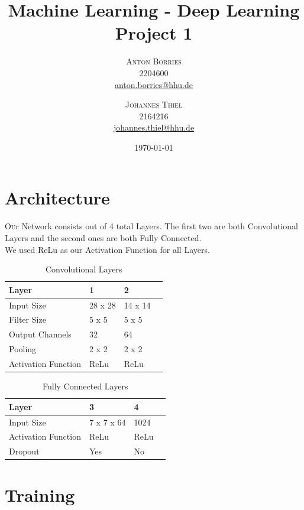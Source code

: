 \documentclass[twoside, twocolumn]{article}
\title{Machine Learning - Deep Learning Project 1} %
\author{%
\textsc{Anton Borries} \\[1ex] 
\normalsize 2204600 \\
\normalsize  \href{mailto:anton.borries@hhu.de}{anton.borries@hhu.de}
\and 
\textsc{Johannes Thiel} \\[1ex]
\normalsize 2164216 \\ 
\normalsize \href{mailto:johannes.thiel@hhu.de}{johannes.thiel@hhu.de} 
}
\date{\today} %
\begin{document}
\maketitle


\section{Architecture}

\lettrine[nindent=.2em,lines=3]{O} ur Network consists out of 4 total Layers. The first two are both Convolutional Layers and the second ones are both Fully Connected. \\
We used ReLu as our Activation Function for all Layers.

\begin{table}[htb]
\label{table_conv}
	\caption{Convolutional Layers}
	\centering
		\begin{tabular}{l l l l}
			Layer & 1 & 2 \\
			\midrule
			Input Size & 28 x 28 & 14 x 14 \\
			Filter Size & 5 x 5 & 5 x 5 \\
			Output Channels & 32 & 64 \\
			Pooling & 2 x 2 & 2 x 2 \\
			Activation Function & ReLu & ReLu \\
\end{tabular}
\end{table}

\begin{table}[htb]
\label{table_fcl}
	\caption{Fully Connected Layers}
	\centering
		\begin{tabular}{l l l l}
			Layer & 3 & 4 \\
			\midrule
			Input Size & 7 x 7 x 64 & 1024 \\
			Activation Function & ReLu & ReLu \\
			Dropout & Yes & No \\
\end{tabular}
\end{table}


\section{Training}
\end{document}
